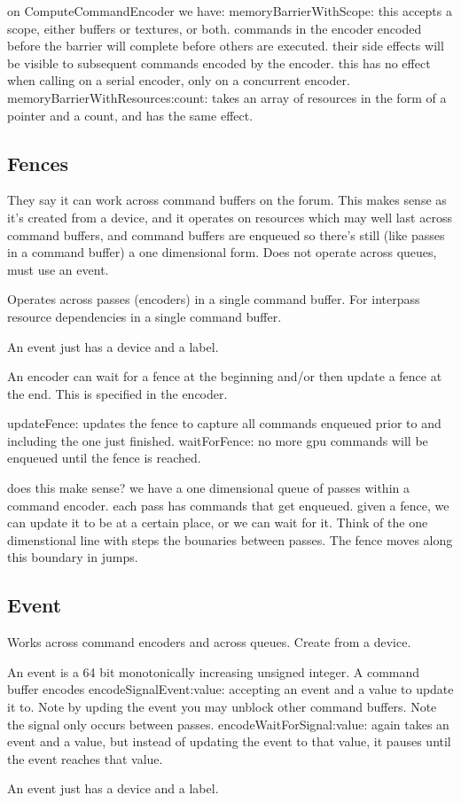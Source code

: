 on ComputeCommandEncoder we have:
memoryBarrierWithScope:
this accepts a scope, either buffers or textures, or both.
commands in the encoder encoded before the barrier will complete before others are executed.
their side effects will be visible to subsequent commands encoded by the encoder.
this has no effect when calling on a serial encoder, only on a concurrent encoder.
memoryBarrierWithResources:count:
takes an array of resources in the form of a pointer and a count, and has the same effect.


\subsection{Fences}

They say it can work across command buffers on the forum.
This makes sense as it's created from a device, and it operates on resources which may well last across command buffers, and command buffers are enqueued so there's still (like passes in a command buffer) a one dimensional form.
Does not operate across queues, must use an event.


Operates across passes (encoders) in a single command buffer.
For interpass resource dependencies in a single command buffer.

An event just has a device and a label.

An encoder can wait for a fence at the beginning and/or then update a fence at the end.
This is specified in the encoder.

updateFence:
updates the fence to capture all commands enqueued prior to and including the one just finished.
waitForFence:
no more gpu commands will be enqueued until the fence is reached. 

does this make sense?
we have a one dimensional queue of passes within a command encoder. each pass has commands that get enqueued.
given a fence, we can update it to be at a certain place, or we can wait for it.
Think of the one dimenstional line with steps the bounaries between passes. The fence moves along this boundary in jumps. 


\subsection{Event}

Works across command encoders and across queues.
Create from a device. 

An event is a 64 bit monotonically increasing unsigned integer.
A command buffer encodes encodeSignalEvent:value: accepting an event and a value to update it to.
Note by upding the event you may unblock other command buffers.
Note the signal only occurs between passes.
encodeWaitForSignal:value: again takes an event and a value, but instead of updating the event to that value, it pauses until the event reaches that value. 

An event just has a device and a label.

